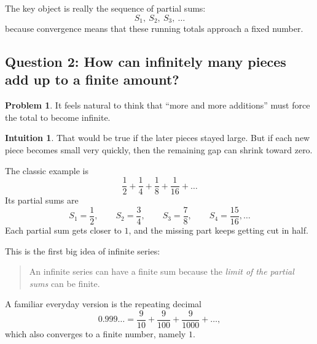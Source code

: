 \documentclass[11pt,a4paper]{article}
\theoremstyle{definition}
\newtheorem*{problem}{Problem}
\newtheorem*{intuition}{Intuition}
\theoremstyle{plain}
\begin{document}
The key object is really the sequence of partial sums:
\[
S_1,\ S_2,\ S_3,\ \dots
\]
because convergence means that these running totals approach a fixed number.

\subsection{Question 2: How can infinitely many pieces add up to a finite amount?}

\begin{problem}
It feels natural to think that ``more and more additions'' must force the total to become infinite.
\end{problem}

\begin{intuition}
That would be true if the later pieces stayed large.
But if each new piece becomes small very quickly, then the remaining gap can shrink toward zero.
\end{intuition}

The classic example is
\[
\frac{1}{2}+\frac{1}{4}+\frac{1}{8}+\frac{1}{16}+\dots
\]
Its partial sums are
\[
S_1=\frac{1}{2},\qquad
S_2=\frac{3}{4},\qquad
S_3=\frac{7}{8},\qquad
S_4=\frac{15}{16},\dots
\]
Each partial sum gets closer to \(1\), and the missing part keeps getting cut in half.

\begin{center}
\end{center}

This is the first big idea of infinite series:
\begin{quote}
An infinite series can have a finite sum because the \emph{limit of the partial sums} can be finite.
\end{quote}

A familiar everyday version is the repeating decimal
\[
0.999\ldots = \frac{9}{10}+\frac{9}{100}+\frac{9}{1000}+\dots,
\]
which also converges to a finite number, namely \(1\).
\end{document}
